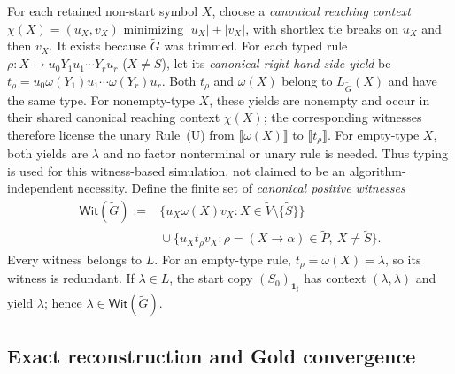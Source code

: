 \documentclass[11pt,a4paper]{article}
\newcommand{\NT}[1]{\llbracket #1\rrbracket}
\theoremstyle{remark}
\theoremstyle{plain}
\newcommand{\WitnessSet}{\mathsf{Wit}}
\begin{document}
For each retained non-start symbol $X$, choose a
\emph{canonical reaching context}
$\chi(X)=(u_X,v_X)$ minimizing $|u_X|+|v_X|$,
with shortlex tie breaks on $u_X$ and then $v_X$.
It exists because $\widetilde G$ was trimmed.  For each typed rule
$\rho:X\to u_0Y_1u_1\cdots Y_ru_r$
($X\ne\widetilde S$), let its
\emph{canonical right-hand-side yield} be
$t_\rho=u_0\omega(Y_1)u_1\cdots\omega(Y_r)u_r$.
Both $t_\rho$ and $\omega(X)$ belong to
$L_{\widetilde G}(X)$ and have the same type.
For nonempty-type $X$, these yields are nonempty and occur
in their shared canonical reaching context $\chi(X)$;
the corresponding witnesses therefore license the unary
Rule~\textup{(U)} from $\NT{\omega(X)}$ to $\NT{t_\rho}$.
For empty-type $X$, both yields are $\lambda$ and no factor
nonterminal or unary rule is needed. Thus typing is used for
this witness-based simulation, not claimed to be an
algorithm-independent necessity.
Define the finite set of \emph{canonical positive witnesses}
\begin{equation}\label{eq:W}
\begin{split}
\WitnessSet(\widetilde G):={}&
 \{u_X\omega(X)v_X:
     X\in\widetilde V\setminus\{\widetilde S\}\}\\
 &{}\cup\{u_Xt_\rho v_X:
     \rho=(X\to\alpha)\in\widetilde P,\
     X\ne\widetilde S\}.
\end{split}
\end{equation}
Every witness belongs to $L$.
For an empty-type rule, $t_\rho=\omega(X)=\lambda$,
so its witness is redundant.  If $\lambda\in L$,
the start copy $(S_0)_{\mathbf{1}_{\sharp}}$ has context
$(\lambda,\lambda)$ and yield $\lambda$; hence
$\lambda\in\WitnessSet(\widetilde G)$.

\subsection{Exact reconstruction and Gold convergence}
\end{document}
